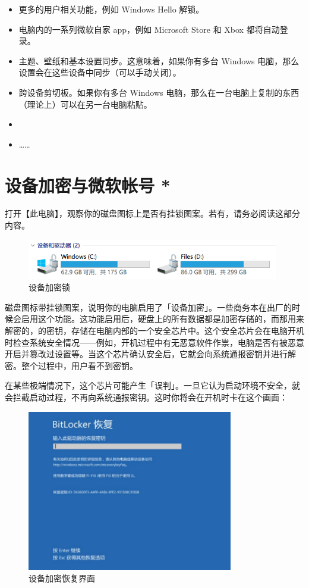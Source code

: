\begin{itemize}
  \item 更多的用户相关功能，例如 Windows Hello 解锁。
  \item 电脑内的一系列微软自家 app，例如 Microsoft Store 和 Xbox 都将自动登录。
  \item 主题、壁纸和基本设置同步。这意味着，如果你有多台 Windows 电脑，那么设置会在这些设备中同步（可以手动关闭）。
  \item 跨设备剪切板。如果你有多台 Windows 电脑，那么在一台电脑上复制的东西（理论上）可以在另一台电脑粘贴。
  \item {}
  \item ……
\end{itemize}

\section{设备加密与微软帐号 *}

打开【此电脑】，观察你的磁盘图标上是否有挂锁图案。若有，请务必阅读这部分内容。

\begin{figure}[htb!]
  \centering
  \includegraphics[width=11cm]{assets/BitLocker.png}
  \caption{设备加密锁}
  \label{bitlocker}
\end{figure}

磁盘图标带挂锁图案，说明你的电脑启用了「设备加密」。一些商务本在出厂的时候会启用这个功能。这功能启用后，硬盘上的所有数据都是加密存储的，而那用来解密的，的密钥，存储在电脑内部的一个安全芯片中。这个安全芯片会在电脑开机时检查系统安全情况——例如，开机过程中有无恶意软件作祟，电脑是否有被恶意开启并篡改过设置等。当这个芯片确认安全后，它就会向系统通报密钥并进行解密。整个过程中，用户看不到密钥。

在某些极端情况下，这个芯片可能产生「误判」。一旦它认为启动环境不安全，就会拦截启动过程，不再向系统通报密钥。这时你将会在开机时卡在这个画面：

\begin{figure}[htb!]
  \centering
  \includegraphics[width=9cm]{assets/RecoverPass.jpg}
  \caption{设备加密恢复界面}
  \label{recover-pass}
\end{figure}

